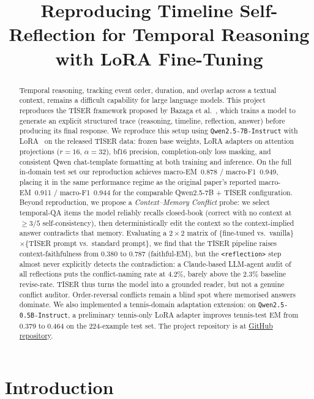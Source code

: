 \documentclass[conference]{IEEEtran}
\title{Reproducing Timeline Self-Reflection for Temporal Reasoning with LoRA Fine-Tuning}
\author{
\IEEEauthorblockN{
Gabriele Adorni s349308,
Berk Calisir s347896
Alessandro Casadei s349386, \\
Taha Atabay Cetin s349501,
Elias Noorzad s314515
}
\IEEEauthorblockA{
Politecnico di Torino\\
Deep Natural Language Processing\\
}
}
\begin{document}
\maketitle

\begin{abstract}
Temporal reasoning, tracking event order, duration, and overlap across a textual context, remains a difficult capability for large language models. This project reproduces the TISER framework proposed by Bazaga et al.~\cite{bazaga2025tiser}, which trains a model to generate an explicit structured trace (reasoning, timeline, reflection, answer) before producing its final response. We reproduce this setup using \texttt{Qwen2.5-7B-Instruct} with LoRA~\cite{hu2022lora} on the released TISER data: frozen base weights, LoRA adapters on attention projections ($r{=}16$, $\alpha{=}32$), bf16 precision, completion-only loss masking, and consistent Qwen chat-template formatting at both training and inference. On the full in-domain test set our reproduction achieves macro-EM~0.878 / macro-F1~0.949, placing it in the same performance regime as the original paper's reported macro-EM~0.911 / macro-F1~0.944 for the comparable Qwen2.5-7B + TISER configuration. Beyond reproduction, we propose a \emph{Context--Memory Conflict} probe: we select temporal-QA items the model reliably recalls closed-book (correct with no context at ${\geq}3/5$ self-consistency), then deterministically edit the context so the context-implied answer contradicts that memory. Evaluating a $2{\times}2$ matrix of \{fine-tuned vs.\ vanilla\}${\times}$\{TISER prompt vs.\ standard prompt\}, we find that the TISER pipeline raises context-faithfulness from 0.380 to 0.787 (faithful-EM), but the \texttt{<reflection>} step almost never explicitly detects the contradiction: a Claude-based LLM-agent audit of all reflections puts the conflict-naming rate at 4.2\%, barely above the 2.3\% baseline revise-rate. TISER thus turns the model into a grounded reader, but not a genuine conflict auditor. Order-reversal conflicts remain a blind spot where memorised answers dominate.
We also implemented a tennis-domain adaptation extension: on \texttt{Qwen2.5-0.5B-Instruct}, a preliminary tennis-only LoRA adapter improves tennis-test EM from 0.379 to 0.464 on the 224-example test set.
The project repository is at \href{https://github.com/thestbobo/tiser_temporal_reasoning_extension}{GitHub repository}.
\end{abstract}

\section{Introduction}
\end{document}

